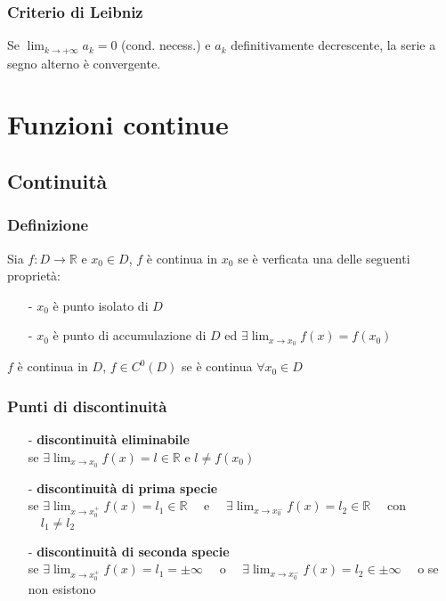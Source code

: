 \documentclass[a4paper]{article}
\newcommand\cont[2]{C^{#1} ({#2})}
\begin{document}
\subsubsection*{Criterio di Leibniz}
Se \(\displaystyle \lim_{k \to +\infty} a_k = 0\) (cond. necess.) e \(a_k\) definitivamente decrescente, la serie a segno alterno è convergente.

\newpage


\section{Funzioni continue}
\subsection{Continuità}
\subsubsection*{Definizione}
Sia \(f:D \to \mathbb{R}\) e \(x_0 \in D\), \(f\) è continua in \(x_0\) se è verficata una delle seguenti proprietà:
\begin{itemize}
	\item[-] \(x_0\) è punto isolato di \(D\)
	\item[-] \(x_0\) è punto di accumulazione di \(D\) ed \(\displaystyle \exists \lim_{x \to x_0} f(x) = f(x_0)\)
\end{itemize}
\(f\) è continua in \(D\), \(f \in \cont{0}{D}\) se è continua \(\forall x_0 \in D\)

\subsubsection*{Punti di discontinuità}
\begin{itemize}
	\item[-] \textbf{discontinuità eliminabile} \\
	se \(\displaystyle \exists \lim_{x \to x_0} f(x) = l \in \mathbb{R}\) e \(l \neq f(x_0)\)
	\item[-] \textbf{discontinuità di prima specie} \\
	se \(\displaystyle \exists \lim_{x \to x_0^+} f(x) = l_1 \in \mathbb{R} \quad\) e \(\displaystyle \quad \exists \lim_{x \to x_0^-} f(x) = l_2 \in \mathbb{R} \quad\) con \(\quad l_1 \neq l_2\)
	\item[-] \textbf{discontinuità di seconda specie} \\
	se \(\displaystyle \exists \lim_{x \to x_0^+} f(x) = l_1 = \pm \infty \quad\) o \(\displaystyle \quad \exists \lim_{x \to x_0^-} f(x) = l_2 \in \pm \infty \quad\) o se non esistono
	
\end{itemize}
\end{document}
